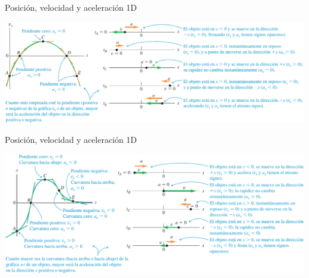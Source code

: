 \documentclass[9pt, aspectratio=169]{beamer}
\begin{document}
\begin{frame}{Posición, velocidad y aceleración 1D}
    \begin{center}
        \includegraphics[width=1.0\textwidth]{figs/xva.png}
    \end{center}
\end{frame}

\begin{frame}{Posición, velocidad y aceleración 1D}
    \begin{center}
        \includegraphics[width=1.0\textwidth]{figs/xva-2.png}
    \end{center}
\end{frame}
\end{document}
